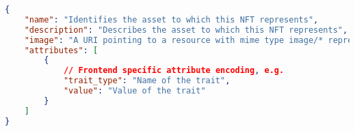 \begin{lstlisting}[language=json,firstnumber=1, basicstyle=\tiny]
{
	"name": "Identifies the asset to which this NFT represents",
	"description": "Describes the asset to which this NFT represents", 
	"image": "A URI pointing to a resource with mime type image/* representing the asset to which this NFT represents",
	"attributes": [ 
		{
			// Frontend specific attribute encoding, e.g.
			"trait_type": "Name of the trait", 
			"value": "Value of the trait"
		}
	]
}
\end{lstlisting}
